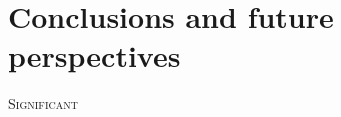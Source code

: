 \chapter{Conclusions and future perspectives}
\label{chap:conclusions}
\minitoc\vspace{2ex}
\lettrine[lines=3]{S}{ignificant}